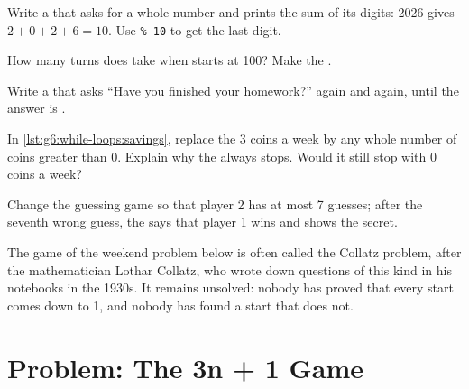 \begin{exercise}[$\star\star$]\label{exo:g6:while-loops:8}
Write a  that asks for a whole number and prints the sum of its digits:
2026 gives $2 + 0 + 2 + 6 = 10$. Use \texttt{\% 10} to get the last digit.
\end{exercise}

\begin{exercise}[$\star\star$]\label{exo:g6:while-loops:9}
How many turns does  take when  starts at
100? Make the .
\end{exercise}

\begin{exercise}[$\star\star\star$]\label{exo:g6:while-loops:10}
Write a  that asks ``Have you finished your homework?'' again and again,
until the answer is .
\end{exercise}

\begin{exercise}[$\star\star\star$]\label{exo:g6:while-loops:11}
In \cref{lst:g6:while-loops:savings}, replace the 3 coins a week by any whole
number of coins greater than 0. Explain why the  always stops. Would it
still stop with 0 coins a week?
\end{exercise}

\begin{exercise}[$\star\star\star$]\label{exo:g6:while-loops:12}
Change the guessing game so that player 2 has at most 7 guesses; after the
seventh wrong guess, the  says that player 1 wins and shows the secret.
\end{exercise}

\begin{history}
The game of the weekend problem below is often called the Collatz problem,
after the mathematician Lothar Collatz, who wrote down questions of this
kind in his notebooks in the 1930s.
It remains unsolved: nobody has proved that every start comes down to 1, and
nobody has found a start that does not.
\end{history}

\section{Problem: The 3n + 1 Game}

